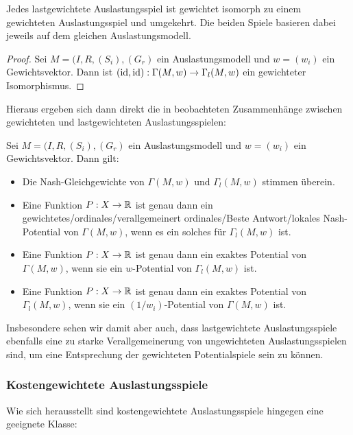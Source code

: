 \begin{lemma}
	Jedes lastgewichtete Auslastungsspiel ist gewichtet isomorph zu einem gewichteten Auslastungsspiel und umgekehrt. Die beiden Spiele basieren dabei jeweils auf dem gleichen Auslastungsmodell.
\end{lemma}

\begin{proof}
	Sei $M = (I, R, (S_i), (G_r)$ ein Auslastungsmodell und $w = (w_i)$ ein Gewichtsvektor. Dann ist $(\mathrm{id}, \mathrm{id}): \Gamma(M, w) \to \Gamma_l(M,w)$ ein gewichteter Isomorphismus.
\end{proof}

Hieraus ergeben sich dann direkt die in \cite{CharExGewPotinWCG} beobachteten Zusammenhänge zwischen gewichteten und lastgewichteten Auslastungsspielen:

\begin{kor}
	Sei $M = (I, R, (S_i), (G_r)$ ein Auslastungsmodell und $w = (w_i)$ ein Gewichtsvektor. Dann gilt:
	\begin{itemize}
		\item Die Nash-Gleichgewichte von $\Gamma(M, w)$ und $\Gamma_l(M,w)$ stimmen überein.
		\item Eine Funktion $P: X \to \mathbb{R}$ ist genau dann ein gewichtetes/ordinales/verallgemeinert ordinales/Beste Antwort/lokales Nash-Potential von $\Gamma(M, w)$, wenn es ein solches für $\Gamma_l(M,w)$ ist.
		\item Eine Funktion $P: X \to \mathbb{R}$ ist genau dann ein exaktes Potential von $\Gamma(M, w)$, wenn sie ein $w$-Potential von $\Gamma_l(M,w)$ ist.
		\item Eine Funktion $P: X \to \mathbb{R}$ ist genau dann ein exaktes Potential von $\Gamma_l(M, w)$, wenn sie ein $(1/w_i)$-Potential von $\Gamma(M,w)$ ist.		
	\end{itemize}
\end{kor}

Insbesondere sehen wir damit aber auch, dass lastgewichtete Auslastungsspiele ebenfalls eine zu starke Verallgemeinerung von ungewichteten Auslastungsspielen sind, um eine Entsprechung der gewichteten Potentialspiele sein zu können.


\subsubsection{Kostengewichtete Auslastungsspiele}

Wie sich herausstellt sind kostengewichtete Auslastungsspiele hingegen eine geeignete Klasse:

